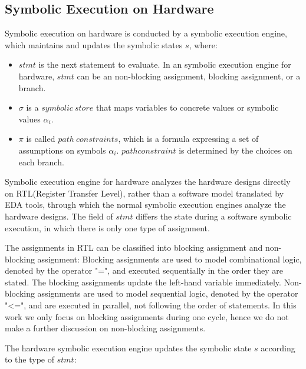 \documentclass[conference]{IEEEtran}
\begin{document}
\subsection{Symbolic Execution on Hardware}
Symbolic execution on hardware is conducted by a symbolic execution engine, which maintains and updates the symbolic states $s$, where:
\begin{itemize}[topsep=1pt]
    \item $stmt$ is the next statement to evaluate. In an symbolic execution engine for hardware, $stmt$ can be an non-blocking assignment, blocking assignment, or a branch. 
    \item $\sigma$ is a $symbolic \ store$ that maps variables to concrete values or symbolic values $\alpha_{i}$.
    \item $\pi$ is called $path \  constraints$, which is a formula expressing a set of assumptions on symbols $\alpha_{i}$. $path constraint$ is determined by the choices on each branch.
\end{itemize}

Symbolic execution engine for hardware analyzes the hardware designs directly on RTL(Register Transfer Level), rather than a software model translated by EDA tools, through which the normal symbolic execution engines analyze the hardware designs. The field of $stmt$ differs the state during a software symbolic execution, in which there is only one type of assignment. 

The assignments in RTL can be classified into blocking assignment and non-blocking assignment: Blocking assignments are used to model combinational logic, denoted by the operator "=", and executed sequentially in the order they are stated. The blocking assignments update the left-hand variable immediately. 
Non-blocking assignments are used to model sequential logic, denoted by the operator "<=", and are executed in parallel, not following the order of statements. In this work we only focus on blocking assignments during one cycle, hence we do not make a further discussion on non-blocking assignments.%

The hardware symbolic execution engine updates the symbolic state $s$ according to the type of $stmt$:
\end{document}

